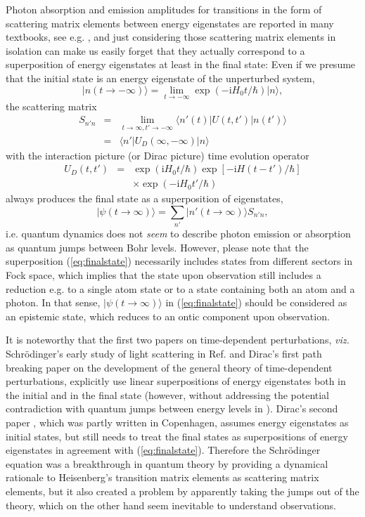 \documentclass[final,3p,times,twocolumn]{elsarticle3}
\begin{document}
Photon absorption and emission amplitudes for transitions in the form of 
scattering matrix elements between energy eigenstates are reported in many 
textbooks, see e.g. \cite{dirac2,heitler,merzbacher,ballentine2,louisqm,rdqm}, 
and just considering those scattering matrix elements in isolation can make 
us easily forget that they actually correspond to a superposition of energy 
eigenstates at least in the final state: Even if we presume that the initial 
state is an energy eigenstate of the unperturbed system,
\[
\bm{|}n(t\to-\infty)\bm{\rangle}=\lim_{t\to-\infty}\exp(-\mathrm{i}H_0t/\hbar)\bm{|}n\bm{\rangle},
\]
the scattering matrix
\begin{eqnarray}\nonumber
S_{n'n}&=&\lim_{t\to\infty,t'\to-\infty}\bm{\langle} n'(t)\bm{|}U(t,t')\bm{|}n(t')\bm{\rangle}
\\  \label{eq:smatrix1}
&=&\bm{\langle} n'\bm{|}U_D(\infty,-\infty)\bm{|}n\bm{\rangle}
\end{eqnarray}
with the interaction picture (or Dirac picture) time evolution operator
\begin{eqnarray}\nonumber 
U_D(t,t')&=&
\exp(\mathrm{i}H_0t/\hbar)
\exp[-\mathrm{i}H(t-t')/\hbar]
\\ \label{eq:UD}
&&\times
\exp(-\mathrm{i}H_0t'/\hbar)
\end{eqnarray}
always produces the final state as a superposition of eigenstates,
\begin{equation}\label{eq:finalstate}
\bm{|}\psi(t\to\infty)\bm{\rangle}=\sum_{n'}\bm{|}n'(t\to\infty)\bm{\rangle} S_{n'n},
\end{equation}
i.e. quantum dynamics does not {\it seem} to describe photon emission or 
absorption as quantum jumps between Bohr levels. However, 
please note that the superposition (\ref{eq:finalstate}) necessarily includes 
states from different sectors in Fock space, which implies that
the state upon observation still includes a reduction e.g. to a single atom
state or to a state containing both an atom and a photon. In that 
sense, $\bm{|}\psi(t\to\infty)\bm{\rangle}$ in (\ref{eq:finalstate}) should be 
considered as an epistemic state, which reduces to an ontic component 
upon observation.

It is noteworthy that the first two papers on time-dependent
perturbations, {\it viz.} Schr\"odinger's early study of light scattering
in Ref. \cite{erwin} and Dirac's first path breaking paper \cite{dirac1a} 
on the development of the general theory of time-dependent perturbations, 
explicitly use linear superpositions of energy eigenstates both in the 
initial and in the final state (however, without addressing the potential 
contradiction with quantum jumps between energy levels in \cite{dirac1a}). 
Dirac's second paper \cite{dirac1b}, which was partly written in Copenhagen,
assumes energy eigenstates as initial states, but still needs to treat
the final states as superpositions of energy eigenstates in agreement
with (\ref{eq:finalstate}).
Therefore the Schr\"odinger equation was a breakthrough in quantum theory 
by providing a dynamical rationale to Heisenberg's transition matrix 
elements as scattering matrix elements, but it also created a problem
by apparently taking the jumps out of the theory, which on the other 
hand seem inevitable to understand observations.
\end{document}
